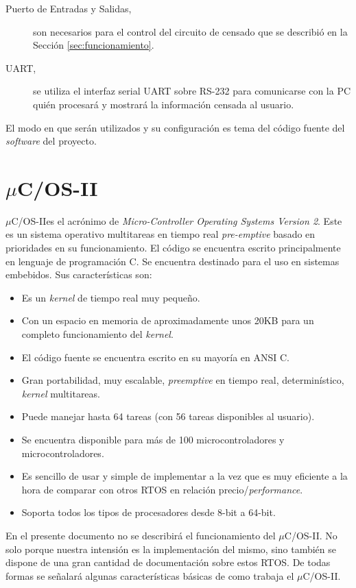 \documentclass[11pt,a4paper,oneside]{article}
\def\uCOS{$\mu$C/OS-II\texttrademark}
\begin{document}
\begin{description}
\item[Puerto de Entradas y Salidas,] son necesarios para el control del circuito de censado que se describió en la Sección \ref{sec:funcionamiento}.
\item[UART,] se utiliza el interfaz serial UART sobre RS-232 para comunicarse con la PC quién procesará y mostrará la información censada al usuario.
\end{description}

El modo en que serán utilizados y su configuración es tema del código fuente del \textsl{software} del proyecto. 

\section{\uCOS}
\label{sec:ucos-ii}


\uCOS es el acrónimo de \textsl{Micro-Controller Operating Systems Version 2}. Este es un sistema operativo multitareas en tiempo real \textsl{pre-emptive} basado en prioridades en su funcionamiento. El código se encuentra escrito principalmente en lenguaje de programación C. Se encuentra destinado para el uso en sistemas embebidos. Sus características son:

\begin{itemize}
\item Es un \textsl{kernel} de tiempo real muy pequeño.
\item Con un espacio en memoria de aproximadamente unos 20KB para un completo funcionamiento del \textsl{kernel}. 
\item El código fuente se encuentra escrito en su mayoría en ANSI C.
\item Gran portabilidad, muy escalable, \textsl{preemptive} en tiempo real, determinístico, \textsl{kernel} multitareas.
\item Puede manejar hasta 64 tareas (con 56 tareas disponibles al usuario).
\item Se encuentra disponible para más de 100 microcontroladores y microcontroladores.
\item Es sencillo de usar y simple de implementar a la vez que es muy eficiente a la hora de comparar con otros RTOS en relación precio/\textsl{performance}.
\item Soporta todos los tipos de procesadores desde 8-bit a 64-bit.
\end{itemize}

En el presente documento no se describirá el funcionamiento del \uCOS. No solo porque nuestra intensión es la implementación del mismo, sino también se dispone de una gran cantidad de documentación sobre estos RTOS. De todas formas se señalará algunas características básicas de como trabaja el \uCOS. 
\end{document}

